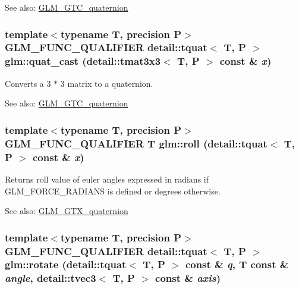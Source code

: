\begin{Desc}
\item[See also:]\hyperlink{group__gtc__quaternion}{GLM\_\-GTC\_\-quaternion} \end{Desc}
\hypertarget{group__gtc__quaternion_ga615768cdd09816fd42da38f484fb4c0}{
\subsubsection[quat\_\-cast]{\setlength{\rightskip}{0pt plus 5cm}template$<$typename T, precision P$>$ GLM\_\-FUNC\_\-QUALIFIER detail::tquat$<$ T, P $>$ glm::quat\_\-cast (detail::tmat3x3$<$ T, P $>$ const \& {\em x})}}
\label{group__gtc__quaternion_ga615768cdd09816fd42da38f484fb4c0}


Converts a 3 $\ast$ 3 matrix to a quaternion.

\begin{Desc}
\item[See also:]\hyperlink{group__gtc__quaternion}{GLM\_\-GTC\_\-quaternion} \end{Desc}
\hypertarget{group__gtc__quaternion_g3f58a75c69ff56cb9c83ea237abc1414}{
\subsubsection[roll]{\setlength{\rightskip}{0pt plus 5cm}template$<$typename T, precision P$>$ GLM\_\-FUNC\_\-QUALIFIER T glm::roll (detail::tquat$<$ T, P $>$ const \& {\em x})}}
\label{group__gtc__quaternion_g3f58a75c69ff56cb9c83ea237abc1414}


Returns roll value of euler angles expressed in radians if GLM\_\-FORCE\_\-RADIANS is defined or degrees otherwise.

\begin{Desc}
\item[See also:]\hyperlink{group__gtx__quaternion}{GLM\_\-GTX\_\-quaternion} \end{Desc}
\hypertarget{group__gtc__quaternion_gca43bc964b553c2bde6a60499c1f2b50}{
\subsubsection[rotate]{\setlength{\rightskip}{0pt plus 5cm}template$<$typename T, precision P$>$ GLM\_\-FUNC\_\-QUALIFIER detail::tquat$<$ T, P $>$ glm::rotate (detail::tquat$<$ T, P $>$ const \& {\em q}, \/  T const \& {\em angle}, \/  detail::tvec3$<$ T, P $>$ const \& {\em axis})}}
\label{group__gtc__quaternion_gca43bc964b553c2bde6a60499c1f2b50}


